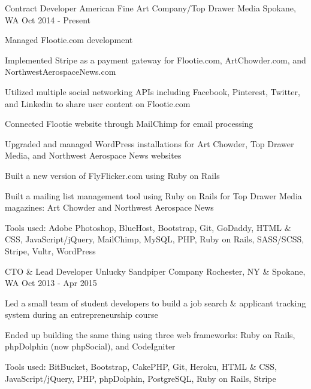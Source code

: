 \begin{cventries}
  \cventry
    {Contract Developer} %
    {American Fine Art Company/Top Drawer Media} %
    {Spokane, WA} %
    {Oct 2014 - Present} %
    {
      \begin{cvitems} %
        \item {Managed Flootie.com development}
        \item {Implemented Stripe as a payment gateway for Flootie.com, ArtChowder.com, and NorthwestAerospaceNews.com}
        \item {Utilized multiple social networking APIs including Facebook, Pinterest, Twitter, and Linkedin to share user content on Flootie.com}
        \item {Connected Flootie website through MailChimp for email processing}
        \item {Upgraded and managed WordPress installations for Art Chowder, Top Drawer Media, and Northwest Aerospace News websites}
        \item {Built a new version of FlyFlicker.com using Ruby on Rails}
        \item {Built a mailing list management tool using Ruby on Rails for Top Drawer Media magazines: Art Chowder and Northwest Aerospace News}
        \item {Tools used: Adobe Photoshop, BlueHost, Bootstrap, Git, GoDaddy, HTML \& CSS, JavaScript/jQuery, MailChimp, MySQL, PHP, Ruby on Rails, SASS/SCSS, Stripe, Vultr, WordPress}
      \end{cvitems}
    }

  \cventry
    {CTO \& Lead Developer} %
    {Unlucky Sandpiper Company} %
    {Rochester, NY \& Spokane, WA} %
    {Oct 2013 - Apr 2015} %
    {
      \begin{cvitems} %
        \item {Led a small team of student developers to build a job search \& applicant tracking system during an entrepreneurship course}
        \item {Ended up building the same thing using three web frameworks: Ruby on Rails, phpDolphin (now phpSocial), and CodeIgniter}
        \item {Tools used: BitBucket, Bootstrap, CakePHP, Git, Heroku, HTML \& CSS, JavaScript/jQuery, PHP, phpDolphin, PostgreSQL, Ruby on Rails, Stripe}
      \end{cvitems}
    }


\end{cventries}
